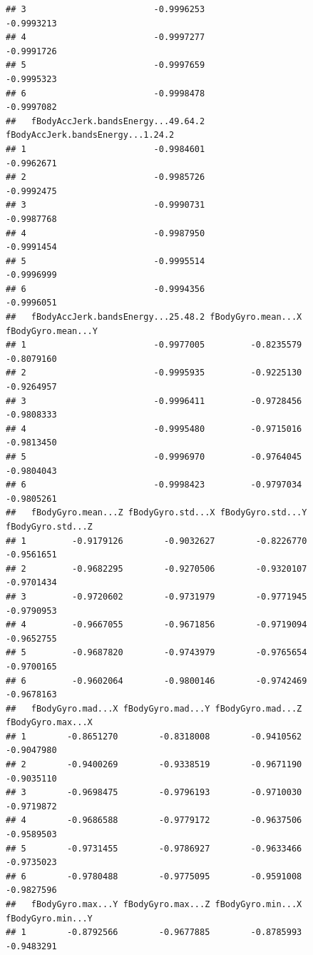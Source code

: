 \documentclass[
]{article}
\begin{document}
\begin{verbatim}
## 3                         -0.9996253                         -0.9993213
## 4                         -0.9997277                         -0.9991726
## 5                         -0.9997659                         -0.9995323
## 6                         -0.9998478                         -0.9997082
##   fBodyAccJerk.bandsEnergy...49.64.2 fBodyAccJerk.bandsEnergy...1.24.2
## 1                         -0.9984601                        -0.9962671
## 2                         -0.9985726                        -0.9992475
## 3                         -0.9990731                        -0.9987768
## 4                         -0.9987950                        -0.9991454
## 5                         -0.9995514                        -0.9996999
## 6                         -0.9994356                        -0.9996051
##   fBodyAccJerk.bandsEnergy...25.48.2 fBodyGyro.mean...X fBodyGyro.mean...Y
## 1                         -0.9977005         -0.8235579         -0.8079160
## 2                         -0.9995935         -0.9225130         -0.9264957
## 3                         -0.9996411         -0.9728456         -0.9808333
## 4                         -0.9995480         -0.9715016         -0.9813450
## 5                         -0.9996970         -0.9764045         -0.9804043
## 6                         -0.9998423         -0.9797034         -0.9805261
##   fBodyGyro.mean...Z fBodyGyro.std...X fBodyGyro.std...Y fBodyGyro.std...Z
## 1         -0.9179126        -0.9032627        -0.8226770        -0.9561651
## 2         -0.9682295        -0.9270506        -0.9320107        -0.9701434
## 3         -0.9720602        -0.9731979        -0.9771945        -0.9790953
## 4         -0.9667055        -0.9671856        -0.9719094        -0.9652755
## 5         -0.9687820        -0.9743979        -0.9765654        -0.9700165
## 6         -0.9602064        -0.9800146        -0.9742469        -0.9678163
##   fBodyGyro.mad...X fBodyGyro.mad...Y fBodyGyro.mad...Z fBodyGyro.max...X
## 1        -0.8651270        -0.8318008        -0.9410562        -0.9047980
## 2        -0.9400269        -0.9338519        -0.9671190        -0.9035110
## 3        -0.9698475        -0.9796193        -0.9710030        -0.9719872
## 4        -0.9686588        -0.9779172        -0.9637506        -0.9589503
## 5        -0.9731455        -0.9786927        -0.9633466        -0.9735023
## 6        -0.9780488        -0.9775095        -0.9591008        -0.9827596
##   fBodyGyro.max...Y fBodyGyro.max...Z fBodyGyro.min...X fBodyGyro.min...Y
## 1        -0.8792566        -0.9677885        -0.8785993        -0.9483291

\end{verbatim}
\end{document}
